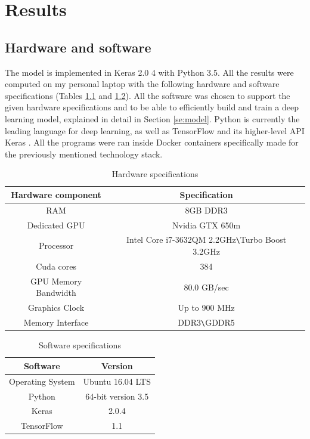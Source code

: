 \documentclass[times, utf8, diplomski]{fer}
\begin{document}
\chapter{Results}
\label{se:results}

\section{Hardware and software}
The model is implemented in Keras 2.0 4 \citep{keras} with Python 3.5. All the results were computed on my personal laptop with the following hardware and software specifications (Tables \ref{tb:hardware_specifications} and \ref{tb:software_specifications}). All the software was chosen to support the given hardware specifications and to be able to efficiently build and train a deep learning model, explained in detail in Section \ref{se:model}. Python is currently the leading language for deep learning, as well as TensorFlow \citep{tensorflow} and its higher-level API Keras \citep{keras}. All the programs were ran inside Docker \citep{docker} containers specifically made for the previously mentioned technology stack.

\begin{table}
\centering
\caption{Hardware specifications}
\label{tb:hardware_specifications}
\begin{tabular}{cc}
\hline 
Hardware component & Specification \\ \hline 
RAM & 8GB DDR3 \\ 
Dedicated GPU & Nvidia GTX 650m \\ 
Processor & Intel Core i7-3632QM 2.2GHz\texttt{\textbackslash}Turbo Boost 3.2GHz\\
Cuda cores & 384 \\
GPU Memory Bandwidth & 80.0 GB/sec\\
Graphics Clock & Up to 900 MHz \\
Memory Interface & DDR3\texttt{\textbackslash}GDDR5 \\
\hline 
\end{tabular} 
\end{table}

\begin{table}
\centering
\caption{Software specifications}
\label{tb:software_specifications}
\begin{tabular}{cc}
\hline 
Software & Version \\ \hline 
Operating System & Ubuntu 16.04 LTS \\ 
Python & 64-bit version 3.5 \\ 
Keras & 2.0.4 \\
TensorFlow & 1.1 \\
\hline 
\end{tabular} 
\end{table}
\end{document}
